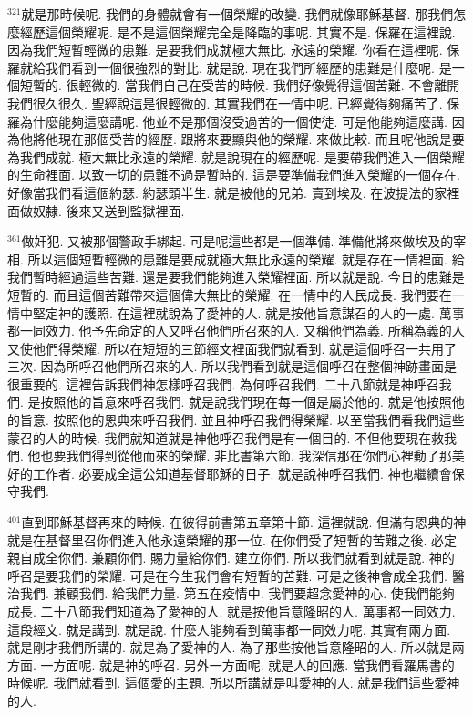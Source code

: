 \documentclass{book}
\begin{document}
$^{321}$就是那時候呢.
我們的身體就會有一個榮耀的改變.
我們就像耶穌基督.
那我們怎麼經歷這個榮耀呢.
是不是這個榮耀完全是降臨的事呢.
其實不是.
保羅在這裡說.
因為我們短暫輕微的患難.
是要我們成就極大無比.
永遠的榮耀.
你看在這裡呢.
保羅就給我們看到一個很強烈的對比.
就是說.
現在我們所經歷的患難是什麼呢.
是一個短暫的.
很輕微的.
當我們自己在受苦的時候.
我們好像覺得這個苦難.
不會離開我們很久很久.
聖經說這是很輕微的.
其實我們在一情中呢.
已經覺得夠痛苦了.
保羅為什麼能夠這麼講呢.
他並不是那個沒受過苦的一個使徒.
可是他能夠這麼講.
因為他將他現在那個受苦的經歷.
跟將來要顯與他的榮耀.
來做比較.
而且呢他說是要為我們成就.
極大無比永遠的榮耀.
就是說現在的經歷呢.
是要帶我們進入一個榮耀的生命裡面.
以致一切的患難不過是暫時的.
這是要準備我們進入榮耀的一個存在.
好像當我們看這個約瑟.
約瑟頭半生.
就是被他的兄弟.
賣到埃及.
在波提法的家裡面做奴隸.
後來又送到監獄裡面.

$^{361}$做奸犯.
又被那個警政手綁起.
可是呢這些都是一個準備.
準備他將來做埃及的宰相.
所以這個短暫輕微的患難是要成就極大無比永遠的榮耀.
就是存在一情裡面.
給我們暫時經過這些苦難.
還是要我們能夠進入榮耀裡面.
所以就是說.
今日的患難是短暫的.
而且這個苦難帶來這個偉大無比的榮耀.
在一情中的人民成長.
我們要在一情中堅定神的護照.
在這裡就說為了愛神的人.
就是按他旨意謀召的人的一處.
萬事都一同效力.
他予先命定的人又呼召他們所召來的人.
又稱他們為義.
所稱為義的人又使他們得榮耀.
所以在短短的三節經文裡面我們就看到.
就是這個呼召一共用了三次.
因為所呼召他們所召來的人.
所以我們看到就是這個呼召在整個神跡畫面是很重要的.
這裡告訴我們神怎樣呼召我們.
為何呼召我們.
二十八節就是神呼召我們.
是按照他的旨意來呼召我們.
就是說我們現在每一個是屬於他的.
就是他按照他的旨意.
按照他的恩典來呼召我們.
並且神呼召我們得榮耀.
以至當我們看我們這些蒙召的人的時候.
我們就知道就是神他呼召我們是有一個目的.
不但他要現在救我們.
他也要我們得到從他而來的榮耀.
非比書第六節.
我深信那在你們心裡動了那美好的工作者.
必要成全這公知道基督耶穌的日子.
就是說神呼召我們.
神也繼續會保守我們.

$^{401}$直到耶穌基督再來的時候.
在彼得前書第五章第十節.
這裡就說.
但滿有恩典的神就是在基督里召你們進入他永遠榮耀的那一位.
在你們受了短暫的苦難之後.
必定親自成全你們.
兼顧你們.
賜力量給你們.
建立你們.
所以我們就看到就是說.
神的呼召是要我們的榮耀.
可是在今生我們會有短暫的苦難.
可是之後神會成全我們.
醫治我們.
兼顧我們.
給我們力量.
第五在疫情中.
我們要超念愛神的心.
使我們能夠成長.
二十八節我們知道為了愛神的人.
就是按他旨意隆昭的人.
萬事都一同效力.
這段經文.
就是講到.
就是說.
什麼人能夠看到萬事都一同效力呢.
其實有兩方面.
就是剛才我們所講的.
就是為了愛神的人.
為了那些按他旨意隆昭的人.
所以就是兩方面.
一方面呢.
就是神的呼召.
另外一方面呢.
就是人的回應.
當我們看羅馬書的時候呢.
我們就看到.
這個愛的主題.
所以所講就是叫愛神的人.
就是我們這些愛神的人.
\end{document}
